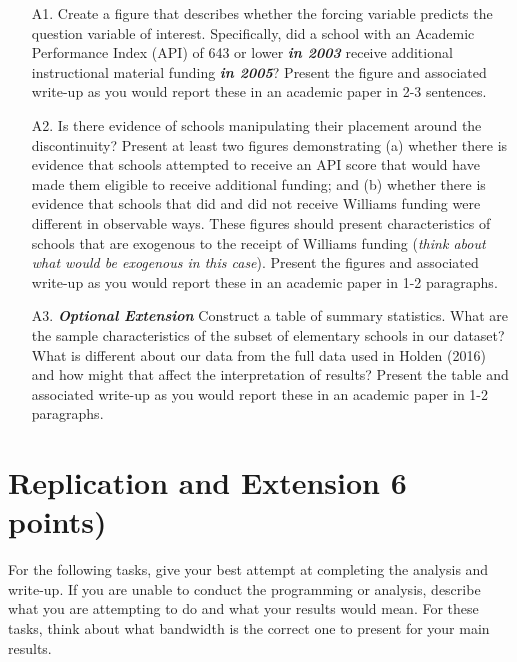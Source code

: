 \documentclass[a4paper, 11pt]{article}
\begin{document}
\begin{enumerate}
	\item[A1.] Create a figure that describes whether the forcing variable predicts the question variable of interest. Specifically, did a school with an Academic Performance Index (API) of 643 or lower \textbf{\textit{in 2003}} receive additional instructional material funding \textbf{\textit{in 2005}}? Present the figure and associated write-up as you would report these in an academic paper in 2-3 sentences.
	\item[A2.] Is there evidence of schools manipulating their placement around the discontinuity? Present at least two figures demonstrating (a) whether there is evidence that schools attempted to receive an API score that would have made them eligible to receive additional funding; and (b) whether there is evidence that schools that did and did not receive Williams funding were different in observable ways. These figures should present characteristics of schools that are exogenous to the receipt of Williams funding (\textit{think about what would be exogenous in this case}). Present the figures and associated write-up as you would report these in an academic paper in 1-2 paragraphs.
	\item[A3.] \textbf{\textit{Optional Extension}} Construct a table of summary statistics. What are the sample characteristics of the subset of elementary schools in our dataset? What is different about our data from the full data used in Holden (2016) and how might that affect the interpretation of results? Present the table and associated write-up as you would report these in an academic paper in 1-2 paragraphs.

\end{enumerate}

\section{Replication and Extension 6 points)}
For the following tasks, give your best attempt at completing the analysis and write-up. If you are unable to conduct the programming or analysis, describe what you are attempting to do and what your results would mean. For these tasks, think about what bandwidth is the correct one to present for your main results.
\end{document}
